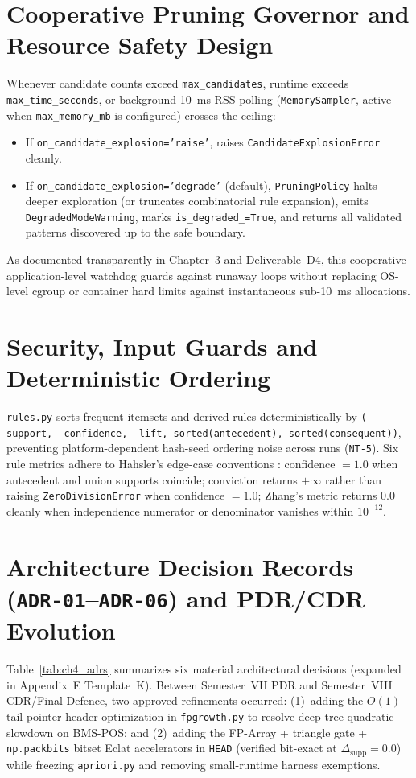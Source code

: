 \section{Cooperative Pruning Governor and Resource Safety Design}
Whenever candidate counts exceed \texttt{max\_\protect\allowbreak{}candidates}, runtime exceeds \texttt{max\_\protect\allowbreak{}time\_\protect\allowbreak{}seconds}, or background 10~ms RSS polling (\texttt{MemorySampler}, active when \texttt{max\_\protect\allowbreak{}memory\_\protect\allowbreak{}mb} is configured) crosses the ceiling:
\begin{itemize}
  \item If \texttt{on\_\protect\allowbreak{}candidate\_\protect\allowbreak{}explosion='raise'}, \skarm raises \texttt{Candidate\protect\allowbreak{}Explosion\protect\allowbreak{}Error} cleanly.
  \item If \texttt{on\_\protect\allowbreak{}candidate\_\protect\allowbreak{}explosion='degrade'} (default), \texttt{PruningPolicy} halts deeper exploration (or truncates combinatorial rule expansion), emits \texttt{DegradedModeWarning}, marks \texttt{is\_\protect\allowbreak{}degraded\_\protect\allowbreak{}=True}, and returns all validated patterns discovered up to the safe boundary.
\end{itemize}
As documented transparently in Chapter~3 and Deliverable~D4, this cooperative application-level watchdog guards against runaway loops without replacing OS-level cgroup or container hard limits against instantaneous sub-10~ms allocations.

\section{Security, Input Guards and Deterministic Ordering}
\texttt{rules.py} sorts frequent itemsets and derived rules deterministically by \texttt{(-support, -confidence, -lift, sorted(antecedent), sorted(consequent))}, preventing platform-dependent hash-seed ordering noise across runs (\texttt{NT-5}). Six rule metrics adhere to Hahsler's edge-case conventions \cite{hahsler}: confidence $=1.0$ when antecedent and union supports coincide; conviction returns $+\infty$ rather than raising \texttt{ZeroDivisionError} when confidence $=1.0$; Zhang's metric returns $0.0$ cleanly when independence numerator or denominator vanishes within $10^{-12}$.

\section{Architecture Decision Records (\texttt{ADR-01}--\texttt{ADR-06}) and PDR/CDR Evolution}
Table~\ref{tab:ch4_adrs} summarizes six material architectural decisions (expanded in Appendix~E Template~K). Between Semester~VII PDR and Semester~VIII CDR/Final Defence, two approved refinements occurred: (1)~adding the $O(1)$ tail-pointer header optimization in \texttt{fpgrowth.py} to resolve deep-tree quadratic slowdown on BMS-POS; and (2)~adding the FP-Array + triangle gate + \texttt{np.packbits} bitset Eclat accelerators in \texttt{HEAD} (verified bit-exact at $\Delta_{\mathrm{supp}}=0.0$) while freezing \texttt{apriori.py} and removing small-runtime harness exemptions.

